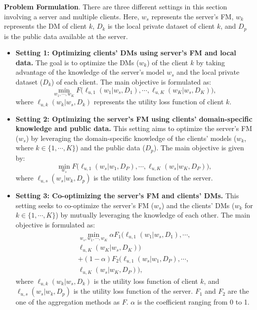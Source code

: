 \textbf{Problem Formulation}. 
There are three different settings in this section involving a server and multiple clients. Here, \(w_s\) represents the server's FM, \(w_k\) represents the DM of client \(k\), \(D_k\) is the local private dataset of client \(k\), and \(D_p\) is the public data available at the server. 


\begin{itemize}
\item \textbf{Setting 1: Optimizing clients' DMs using server's FM and local data.}
The goal is to optimize the DMs (\(w_k\)) of the client $k$ by taking advantage of the knowledge of the server's model \(w_s\) and the local private dataset (\(D_k\)) of each client. The main objective is formulated as:
\begin{equation*}\label{eq:bi - setting_1}
\min_{w_1, \cdots, w_K}F\Big(\ell_{u,1}(w_1|w_s ,D_1), \cdots, \ell_{u,K}(w_K|w_s ,D_K) \Big),
\end{equation*}
where \(\ell_{u,k}(w_k|w_s ,D_k)\) represents the utility loss function of client \(k\).

\item \textbf{Setting 2: Optimizing the server's FM using clients' domain-specific knowledge and public data.}
    This setting aims to optimize the server's FM (\(w_s\)) by leveraging the domain-specific knowledge of the clients' models (\(w_{k}\), where \(k\in\{1,\cdots,K\}\)) and the public data (\(D_p\)). The main objective is given by:
\begin{equation*}\label{eq:bi - setting_2}
\min_{w_s}F\Big(\ell_{u,1}(w_s|w_1 ,D_P), \cdots, \ell_{u,K}(w_s|w_K ,D_P) \Big),\end{equation*}
where \(\ell_{u,s}(w_s|w_k, D_p)\) is the utility loss function of the server. 

    \item \textbf{Setting 3: Co-optimizing the server's FM and clients' DMs.}
    This setting seeks to co-optimize the server's FM (\(w_s\)) and the clients' DMs (\(w_k\) for \(k\in\{1,\cdots,K\}\)) by mutually leveraging the knowledge of each other. The main objective is formulated as:
\begin{equation}\label{eq:bi - setting_3}
\begin{split}
    \min_{w_s, w_1, \cdots, w_K}\alpha F_1\Big(\ell_{u,1}(w_1|w_s ,D_1), \cdots, \\\ell_{u,K}(w_K|w_s ,D_K) \Big)\\ + (1-\alpha)F_2\Big(\ell_{u,1}(w_s|w_1 ,D_P), \cdots, \\\ell_{u,K}(w_s|w_K ,D_P) \Big),
    \end{split}
\end{equation}
where \(\ell_{u,k}(w_k|w_s ,D_k)\) is the utility loss function of client \(k\), and \(\ell_{u,s}(w_s|w_k, D_p)\) is the utility loss function of the server. $F_1$ and $F_2$ are the one of the aggregation methods as $F$. $\alpha$ is the coefficient ranging from 0 to 1.
\end{itemize}




